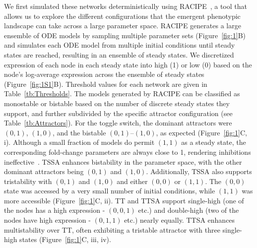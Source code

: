 \documentclass[11pt]{article}
\begin{document}
We first simulated these networks deterministically using RACIPE~\cite{Huang2017}, a tool that allows us to explore the different configurations that the emergent phenotypic landscape can take across a large parameter space. RACIPE generates a large ensemble of ODE models by sampling multiple parameter sets (Figure~\ref{fig:1}B) and simulates each ODE model from multiple initial conditions until steady states are reached, resulting in an ensemble of steady states. We discretized expression of each node in each steady state into high (1) or low (0) based on the node's log-average expression across the ensemble of steady states (Figure~\ref{fig:1S1}B).  Threshold values for each network are given in Table~\ref{tb:Thresholds}. The models generated by RACIPE can be classified as monostable or bistable based on the number of discrete steady states they support, and further subdivided by the specific attractor configuration (see Table~\ref{tb:Attractors}). For the toggle switch, the dominant attractors were $(0,1)$, $(1,0)$, and the bistable $(0,1)\text{--}(1,0)$, as expected (Figure~\ref{fig:1}C, i). Although a small fraction of models do permit $(1,1)$ as a steady state, the corresponding fold-change parameters are always close to 1, rendering inhibitions ineffective~\cite{hari_assessing_2023}. TSSA enhances bistability in the parameter space, with the other dominant attractors being $(0,1)$ and $(1,0)$. Additionally, TSSA also supports tristability with $(0,1)$ and $(1,0)$ and either $(0, 0)$ or $(1, 1)$. The $(0, 0)$ state was accessed by a very small number of initial conditions, while $(1, 1)$ was more accessible (Figure~\ref{fig:1}C, ii). TT and TTSA support single-high (one of the nodes has a high expression - $(0, 0, 1)$ etc.) and double-high (two of the nodes have high expression - $(0, 1, 1)$ etc.) nearly equally. TTSA enhances multistability over TT, often exhibiting a tristable attractor with three single-high states (Figure~\ref{fig:1}C, iii, iv).
\end{document}
